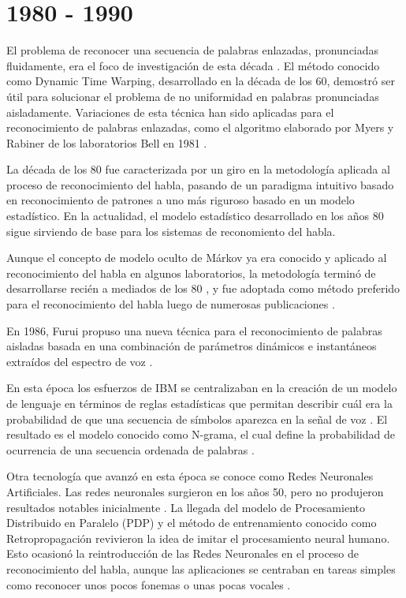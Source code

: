 \section{1980 - 1990}
\label{sec:80s}

El problema de reconocer una secuencia de palabras enlazadas, pronunciadas fluidamente, era el foco
de investigaci\'{o}n de esta d\'{e}cada \cite{Furui50Years2004}. El m\'{e}todo conocido como 
Dynamic Time Warping, desarrollado en la d\'{e}cada de los 60, demostr\'{o} ser \'{u}til para solucionar el problema de no uniformidad
en palabras pronunciadas aisladamente. Variaciones de esta t\'{e}cnica han sido aplicadas para el 
reconocimiento de palabras enlazadas, como el algoritmo elaborado por Myers y Rabiner de los laboratorios Bell
en 1981 \cite{MyersALevel1981}.

La d\'{e}cada de los 80 fue caracterizada por un giro en la metodolog\'{i}a aplicada al proceso de
reconocimiento del habla, pasando de un paradigma intuitivo basado en reconocimiento de patrones 
a uno m\'{a}s riguroso basado en un modelo estad\'{i}stico. En la actualidad, el modelo estad\'{i}stico
desarrollado en los a\~{n}os 80 sigue sirviendo de base para los sistemas de reconomiento del habla.

Aunque el concepto de modelo oculto de M\'{a}rkov ya era conocido y aplicado al reconocimiento del habla 
en algunos laboratorios, la metodolog\'{i}a termin\'{o} de desarrollarse reci\'{e}n a mediados 
de los 80 \cite{JuangAutomaticSpeech}, y fue adoptada como m\'{e}todo preferido para el reconocimiento 
del habla luego de numerosas publicaciones \cite{LevinsonAnIntroduction1983, FergusonHidden1980}.

En 1986, Furui propuso una nueva t\'{e}cnica para el reconocimiento de palabras aisladas basada en
una combinaci\'{o}n de par\'{a}metros din\'{a}micos e instant\'{a}neos 
extra\'{i}dos del espectro de voz \cite{FuruiSpeaker1986}.

En esta \'{e}poca los esfuerzos de IBM se centralizaban en la creaci\'{o}n de un modelo de lenguaje en t\'{e}rminos de
reglas estad\'{i}sticas que permitan describir cu\'{a}l era la probabilidad de que una 
secuencia de s\'{i}mbolos aparezca en la se\~{n}al de voz \cite{Furui50Years2004}. El resultado es el
modelo conocido como N-grama, el cual define la probabilidad de ocurrencia de una secuencia ordenada
de palabras \cite{JelinekTheDevelopment1986}.

Otra tecnolog\'{i}a que avanz\'{o} en esta \'{e}poca se conoce como Redes Neuronales Artificiales. Las 
redes neuronales surgieron en los a\~{n}os 50, pero no produjeron resultados notables 
inicialmente \cite{JuangAutomaticSpeech}. La llegada del modelo de Procesamiento Distribuido 
en Paralelo (PDP) y el m\'{e}todo de entrenamiento conocido como Retropropagaci\'{o}n
revivieron la idea de imitar el procesamiento neural humano. Esto ocasion\'{o} la reintroducci\'{o}n de
las Redes Neuronales en el proceso de reconocimiento del habla, aunque las aplicaciones se centraban en tareas simples
como reconocer unos pocos fonemas o unas pocas vocales \cite{JuangAutomaticSpeech}.

